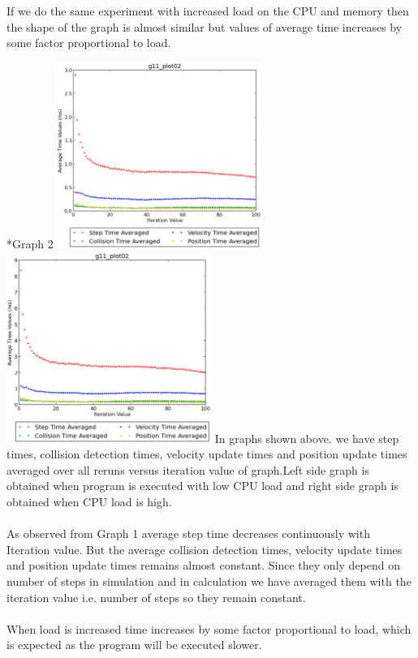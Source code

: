 \documentclass[11pt]{article}
\begin{document}
\begin{subsection}
\\\\
If we do the same experiment with increased load on the CPU and memory then the shape of the graph is almost similar but values of average time increases by some factor proportional to load.
\end{subsection}

\begin{subsection}*{Graph 2}
\includegraphics[width=0.5\textwidth,keepaspectratio]{2.eps} \includegraphics[width=0.5\textwidth,keepaspectratio]{load_2.eps}
In graphs shown above. we have step times, collision detection times, velocity update times and position update times averaged over all reruns versus iteration value of graph.Left side graph is obtained when program is executed with low CPU load and right side graph is obtained when CPU load is high.
\\\\
As observed from Graph 1 average step time decreases continuously with Iteration value.
But the average collision detection times, velocity update times and position update times remains almost constant. Since they only depend on number of steps in simulation and in calculation we have averaged them with the iteration value i.e. number of steps so they remain constant.
\\\\
When load is increased time increases by some factor proportional to load, which is expected as the program will be executed slower. 
\end{subsection}
\end{document}
